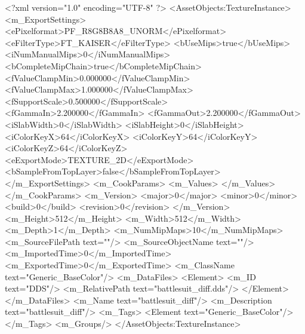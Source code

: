 <?xml version="1.0" encoding="UTF-8" ?>
<AssetObjects:TextureInstance>
<m_ExportSettings>
<ePixelformat>PF_R8G8B8A8_UNORM</ePixelformat>
<eFilterType>FT_KAISER</eFilterType>
<bUseMips>true</bUseMips>
<iNumManualMips>0</iNumManualMips>
<bCompleteMipChain>true</bCompleteMipChain>
<fValueClampMin>0.000000</fValueClampMin>
<fValueClampMax>1.000000</fValueClampMax>
<fSupportScale>0.500000</fSupportScale>
<fGammaIn>2.200000</fGammaIn>
<fGammaOut>2.200000</fGammaOut>
<iSlabWidth>0</iSlabWidth>
<iSlabHeight>0</iSlabHeight>
<iColorKeyX>64</iColorKeyX>
<iColorKeyY>64</iColorKeyY>
<iColorKeyZ>64</iColorKeyZ>
<eExportMode>TEXTURE_2D</eExportMode>
<bSampleFromTopLayer>false</bSampleFromTopLayer>
</m_ExportSettings>
<m_CookParams>
<m_Values>
</m_Values>
</m_CookParams>
<m_Version>
<major>0</major>
<minor>0</minor>
<build>0</build>
<revision>0</revision>
</m_Version>
<m_Height>512</m_Height>
<m_Width>512</m_Width>
<m_Depth>1</m_Depth>
<m_NumMipMaps>10</m_NumMipMaps>
<m_SourceFilePath text=""/>
<m_SourceObjectName text=""/>
<m_ImportedTime>0</m_ImportedTime>
<m_ExportedTime>0</m_ExportedTime>
<m_ClassName text="Generic_BaseColor"/>
<m_DataFiles>
<Element>
<m_ID text="DDS"/>
<m_RelativePath text="battlesuit_diff.dds"/>
</Element>
</m_DataFiles>
<m_Name text="battlesuit_diff"/>
<m_Description text="battlesuit_diff"/>
<m_Tags>
<Element text="Generic_BaseColor"/>
</m_Tags>
<m_Groups/>
</AssetObjects:TextureInstance>
